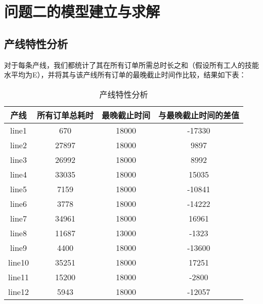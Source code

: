 \section{问题二的模型建立与求解}

\subsection{产线特性分析}
对于每条产线，我们都统计了其在所有订单所需总时长之和（假设所有工人的技能水平均为E），并将其与该产线所有订单的最晚截止时间作比较，结果如下表：
\begin{table}[htbp]
    \caption{产线特性分析}
    \label{tab:workline} 
    \centering
    \begin{tabular}{@{\hspace{10pt}}cccc@{\hspace{10pt}}}
        \toprule[1.5pt]
        产线 & 所有订单总耗时 & 最晚截止时间 & 与最晚截止时间的差值\\
        \midrule[1pt]
        line1  & 670 & 18000 &  -17330 \\
        line2  & 27897 & 18000 & 9897          \\
        line3  & 26992 & 18000 & 8992         \\
        line4  & 33035 & 18000 & 15035         \\
        line5  & 7159 & 18000 & -10841      \\
        line6  & 3778 & 18000 &  -14222  \\
        line7  & 34961 & 18000 &  16961 \\
        line8  & 11687  & 13000 &  -1323\\
        line9  & 4400   & 18000 & -13600 \\
        line10 & 35251 &  18000 &     17251\\
        line11 & 15200  & 18000 &     -2800 \\
        line12 & 5943   & 18000 & -12057\\ 
        \bottomrule[1.5pt]
    \end{tabular}
\end{table}

